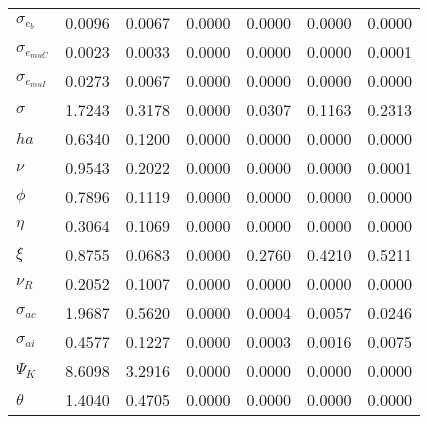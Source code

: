 \begin{center}
\begin{longtable}{lcccccc}
$ \sigma_{{e_b}}       $	 & 	          0.0096	 & 	          0.0067	 & 	          0.0000	 & 	          0.0000	 & 	          0.0000	 & 	          0.0000 \\ 
$ \sigma_{{e_{muC}}}   $	 & 	          0.0023	 & 	          0.0033	 & 	          0.0000	 & 	          0.0000	 & 	          0.0000	 & 	          0.0001 \\ 
$ \sigma_{{e_{muI}}}   $	 & 	          0.0273	 & 	          0.0067	 & 	          0.0000	 & 	          0.0000	 & 	          0.0000	 & 	          0.0000 \\ 
$ {\sigma}             $	 & 	          1.7243	 & 	          0.3178	 & 	          0.0000	 & 	          0.0307	 & 	          0.1163	 & 	          0.2313 \\ 
$ {ha}                 $	 & 	          0.6340	 & 	          0.1200	 & 	          0.0000	 & 	          0.0000	 & 	          0.0000	 & 	          0.0000 \\ 
$ \nu                  $	 & 	          0.9543	 & 	          0.2022	 & 	          0.0000	 & 	          0.0000	 & 	          0.0000	 & 	          0.0001 \\ 
$ {\phi}               $	 & 	          0.7896	 & 	          0.1119	 & 	          0.0000	 & 	          0.0000	 & 	          0.0000	 & 	          0.0000 \\ 
$ {\eta}               $	 & 	          0.3064	 & 	          0.1069	 & 	          0.0000	 & 	          0.0000	 & 	          0.0000	 & 	          0.0000 \\ 
$ \xi                  $	 & 	          0.8755	 & 	          0.0683	 & 	          0.0000	 & 	          0.2760	 & 	          0.4210	 & 	          0.5211 \\ 
$ {\nu_R}              $	 & 	          0.2052	 & 	          0.1007	 & 	          0.0000	 & 	          0.0000	 & 	          0.0000	 & 	          0.0000 \\ 
$ {\sigma_{ac}}        $	 & 	          1.9687	 & 	          0.5620	 & 	          0.0000	 & 	          0.0004	 & 	          0.0057	 & 	          0.0246 \\ 
$ {\sigma_{ai}}        $	 & 	          0.4577	 & 	          0.1227	 & 	          0.0000	 & 	          0.0003	 & 	          0.0016	 & 	          0.0075 \\ 
$ {\Psi_{K}}           $	 & 	          8.6098	 & 	          3.2916	 & 	          0.0000	 & 	          0.0000	 & 	          0.0000	 & 	          0.0000 \\ 
$ {\theta}             $	 & 	          1.4040	 & 	          0.4705	 & 	          0.0000	 & 	          0.0000	 & 	          0.0000	 & 	          0.0000 \\ 

\end{longtable}
\end{center}
